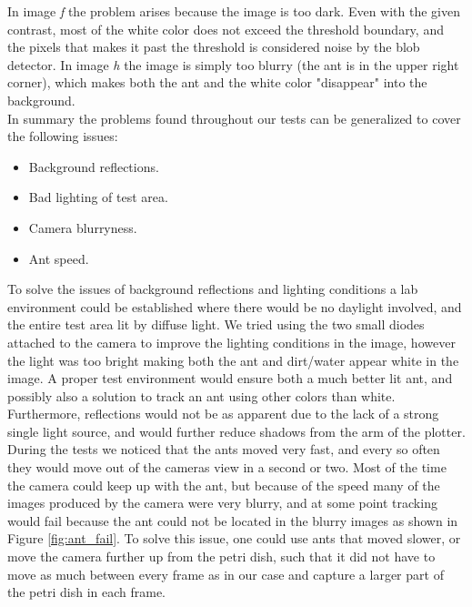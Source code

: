 In image \emph{f} the problem arises because the image is too dark. Even with the given contrast, most of the white color does not exceed the threshold boundary, and the pixels that makes it past the threshold is considered noise by the blob detector. In image \emph{h} the image is simply too blurry (the ant is in the upper right corner), which makes both the ant and the white color "disappear" into the background.\\

In summary the problems found throughout our tests can be generalized to cover the following issues:

\begin{itemize}
    \item Background reflections.
    \item Bad lighting of test area.
    \item Camera blurryness.
    \item Ant speed.
\end{itemize}

To solve the issues of background reflections and lighting conditions a lab environment could be established where there would be no daylight involved, and the entire test area lit by diffuse light. We tried using the two small diodes attached to the camera to improve the lighting conditions in the image, however the light was too bright making both the ant and dirt/water appear white in the image. A proper test environment would ensure both a much better lit ant, and possibly also a solution to track an ant using other colors than white. Furthermore, reflections would not be as apparent due to the lack of a strong single light source, and would further reduce shadows from the arm of the plotter.\\

During the tests we noticed that the ants moved very fast, and every so often they would move out of the cameras view in a second or two. Most of the time the camera could keep up with the ant, but because of the speed many of the images produced by the camera were very blurry, and at some point tracking would fail because the ant could not be located in the blurry images as shown in Figure \ref{fig:ant_fail}. To solve this issue, one could use ants that moved slower, or move the camera further up from the petri dish, such that it did not have to move as much between every frame as in our case and capture a larger part of the petri dish in each frame. \\

